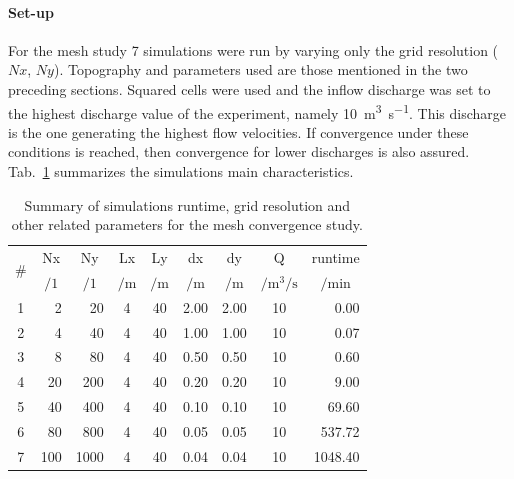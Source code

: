 \paragraph{Set-up} For the mesh study \num{7} simulations were run by varying only the grid resolution ($Nx$, $Ny$). 
Topography and parameters used are those mentioned in the two preceding sections.
Squared cells were used and the inflow discharge was set to the highest discharge value of the experiment, namely \SI{10}{\cubic\meter\per\second}.
This discharge is the one generating the highest flow velocities.
If convergence under these conditions is reached, then convergence for lower discharges is also assured.
Tab.~\ref{tab:mesh_study} summarizes the simulations main characteristics.

\begin{table}[h]
  \centering
  \caption{Summary of simulations runtime, grid resolution and other related parameters for the mesh convergence study.}
  \label{tab:mesh_study}
  \begin{tabular}{crrcccccr}
    \toprule
    \multirow{2}{*}{\#} & \multicolumn{1}{c}{Nx} & \multicolumn{1}{c}{Ny} & \multicolumn{1}{c}{Lx} & \multicolumn{1}{c}{Ly} & \multicolumn{1}{c}{dx} & \multicolumn{1}{c}{dy} & \multicolumn{1}{c}{Q} & \multicolumn{1}{c}{runtime} \\
       & \multicolumn{1}{c}{$/1$} & \multicolumn{1}{c}{$/1$} & \multicolumn{1}{c}{$/\si{\meter}$} & \multicolumn{1}{c}{$/\si{\m}$} & \multicolumn{1}{c}{$/\si{\m}$} & \multicolumn{1}{c}{$/\si{\m}$} & \multicolumn{1}{c}{$/\si{\cubic\m\per\s}$} & \multicolumn{1}{c}{$/\si{\minute}$} \\ 
    \midrule
    1  & 2             & 20            & 4               & 40          & 2.00        & 2.00        & 10                      & 0.00 \\
    2  & 4             & 40            & 4               & 40          & 1.00        & 1.00        & 10                      & 0.07 \\
    3  & 8             & 80            & 4               & 40          & 0.50        & 0.50        & 10                      & 0.60 \\
    4  & 20            & 200           & 4               & 40          & 0.20        & 0.20        & 10                      & 9.00 \\
    5  & 40            & 400           & 4               & 40          & 0.10        & 0.10        & 10                      & 69.60 \\
    6  & 80            & 800           & 4               & 40          & 0.05        & 0.05        & 10                      & 537.72 \\
    7  & 100           & 1000         & 4               & 40          & 0.04        & 0.04        & 10                      & 1048.40 \\
    \bottomrule
  \end{tabular}
\end{table} 

